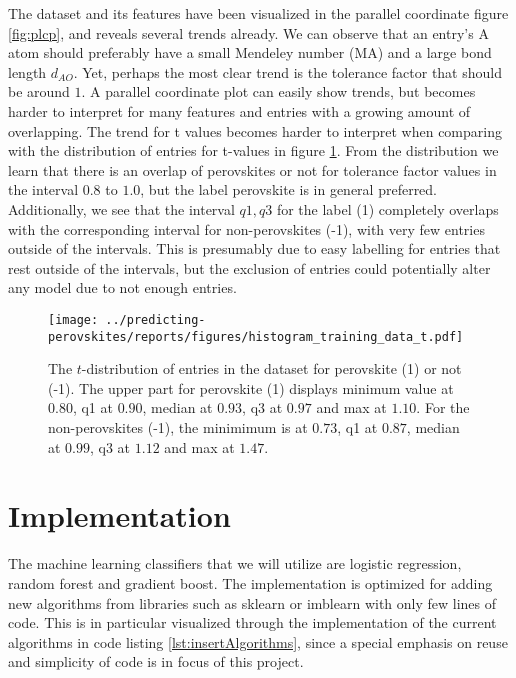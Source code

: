 \noindent The dataset and its features have been visualized in the parallel coordinate \cite{Inselberga} figure \ref{fig:plcp}, and reveals several trends already. We can observe that an entry's A atom should preferably have a small Mendeley number (MA) and a large bond length $d_{AO}$. Yet, perhaps the most clear trend is the tolerance factor that should be around $1$. A parallel coordinate plot can easily show trends, but becomes harder to interpret for many features and entries with a growing amount of overlapping. The trend for t values becomes harder to interpret when comparing with the distribution of entries for t-values in figure \ref{fig:hist_perov_t}. From the distribution we learn that there is an overlap of perovskites or not for tolerance factor values in the interval $0.8$ to $1.0$, but the label perovskite is in general preferred. Additionally, we see that the interval ${q1,q3}$ for the label (1) completely overlaps with the corresponding interval for non-perovskites (-1), with very few entries outside of the intervals. This is presumably due to easy labelling for entries that rest outside of the intervals, but the exclusion of entries could potentially alter any model due to not enough entries. %


\begin{figure}[ht!]
  \centering
  \texttt{[image: ../predicting-perovskites/reports/figures/histogram\_training\_data\_t.pdf]}
  \caption{The $t$-distribution of entries in the dataset for perovskite (1) or not (-1). The upper part for perovskite (1) displays minimum value at $0.80$, q1 at $0.90$, median at $0.93$, q3 at $0.97$ and max at $1.10$. For the non-perovskites (-1), the minimimum is at $0.73$, q1 at $0.87$, median at $0.99$, q3 at $1.12$ and max at $1.47$.}
  \label{fig:hist_perov_t}
\end{figure}

\section{Implementation}

The machine learning classifiers that we will utilize are logistic regression, random forest and gradient boost. The implementation is optimized for adding new algorithms from libraries such as sklearn \cite{Pedregosa2012} or imblearn \cite{Lemaitre2016} with only few lines of code. This is in particular visualized through the implementation of the current algorithms in code listing \ref{lst:insertAlgorithms}, since a special emphasis on reuse and simplicity of code is in focus of this project.

